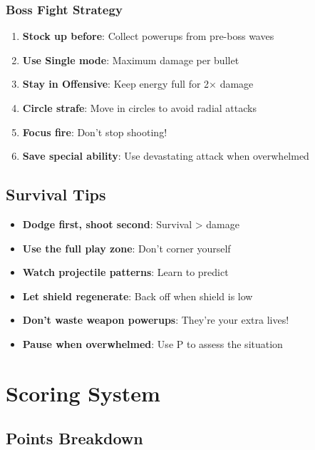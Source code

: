 \documentclass[11pt,a4paper]{article}
\begin{document}
\subsubsection{Boss Fight Strategy}

\begin{enumerate}[leftmargin=*]
    \item \textbf{Stock up before}: Collect powerups from pre-boss waves
    \item \textbf{Use Single mode}: Maximum damage per bullet
    \item \textbf{Stay in Offensive}: Keep energy full for 2× damage
    \item \textbf{Circle strafe}: Move in circles to avoid radial attacks
    \item \textbf{Focus fire}: Don't stop shooting!
    \item \textbf{Save special ability}: Use devastating attack when overwhelmed
\end{enumerate}

\subsection{Survival Tips}

\begin{tcolorbox}[colback=successcolor!10, colframe=successcolor, title=\faHeart~Stay Alive!]
\begin{itemize}[nosep]
    \item \textbf{Dodge first, shoot second}: Survival > damage
    \item \textbf{Use the full play zone}: Don't corner yourself
    \item \textbf{Watch projectile patterns}: Learn to predict
    \item \textbf{Let shield regenerate}: Back off when shield is low
    \item \textbf{Don't waste weapon powerups}: They're your extra lives!
    \item \textbf{Pause when overwhelmed}: Use P to assess the situation
\end{itemize}
\end{tcolorbox}

\section{Scoring System}

\subsection{Points Breakdown}
\end{document}
